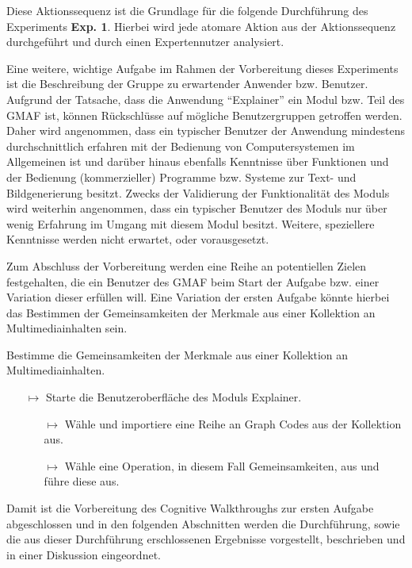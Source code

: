Diese Aktionssequenz ist die Grundlage für die folgende Durchführung des Experiments \textbf{Exp. 1}.
Hierbei wird jede atomare Aktion aus der Aktionssequenz durchgeführt und durch einen Expertennutzer analysiert.

Eine weitere, wichtige Aufgabe im Rahmen der Vorbereitung dieses Experiments ist die Beschreibung der Gruppe zu erwartender Anwender bzw. Benutzer.
Aufgrund der Tatsache, dass die Anwendung \enquote{Explainer} ein Modul bzw. Teil des GMAF ist, können Rückschlüsse auf mögliche Benutzergruppen getroffen werden.
Daher wird angenommen, dass ein typischer Benutzer der Anwendung mindestens durchschnittlich erfahren mit der Bedienung von Computersystemen im Allgemeinen ist und darüber hinaus ebenfalls Kenntnisse über Funktionen und der Bedienung (kommerzieller) Programme bzw. Systeme zur Text- und Bildgenerierung besitzt.
Zwecks der Validierung der Funktionalität des Moduls wird weiterhin angenommen, dass ein typischer Benutzer des Moduls nur über wenig Erfahrung im Umgang mit diesem Modul besitzt.
Weitere, speziellere Kenntnisse werden nicht erwartet, oder vorausgesetzt.

Zum Abschluss der Vorbereitung werden eine Reihe an potentiellen Zielen festgehalten, die ein Benutzer des GMAF beim Start der Aufgabe bzw. einer Variation dieser erfüllen will.
Eine Variation der ersten Aufgabe könnte hierbei das Bestimmen der Gemeinsamkeiten der Merkmale aus einer Kollektion an Multimediainhalten sein.

\begin{tcolorbox}[minipage, colback=white, colframe=black, arc=0pt, outer arc=0pt]
  Bestimme die Gemeinsamkeiten der Merkmale aus einer Kollektion an Multimediainhalten.
  \begin{itemize}
    \item[$\mapsto$] Starte die Benutzeroberfläche des Moduls Explainer.
    \begin{itemize}
      \item[$\mapsto$] Wähle und importiere eine Reihe an Graph Codes aus der Kollektion aus.
      \item[$\mapsto$] Wähle eine Operation, in diesem Fall Gemeinsamkeiten, aus und führe diese aus.
    \end{itemize}
  \end{itemize}
\end{tcolorbox}

Damit ist die Vorbereitung des Cognitive Walkthroughs zur ersten Aufgabe abgeschlossen und in den folgenden Abschnitten werden die Durchführung, sowie die aus dieser Durchführung erschlossenen Ergebnisse vorgestellt, beschrieben und in einer Diskussion eingeordnet.

